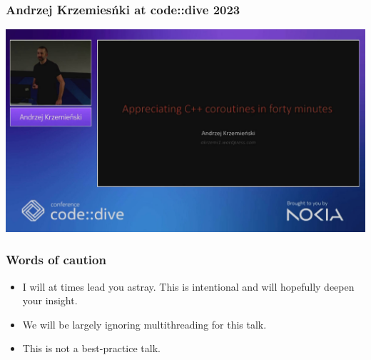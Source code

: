 \documentclass[aspectratio=169]{beamer}
\begin{document}
\begin{frame}
  \frametitle{Andrzej Krzemiesńki at code::dive 2023}

  \begin{center}
    \href{https://www.youtube.com/watch?v=ZSkign_3Hp4}{\includegraphics[height=.95\textheight]{corogfx2/talk_andrzej.jpg}}
  \end{center}
  
\end{frame}

\begin{frame}
  \frametitle{Words of caution}
  
  \begin{itemize}
  \item I will at times lead you astray. This is intentional and will hopefully deepen your insight.
  \vspace{20pt}
  \item We will be largely ignoring multithreading for this talk.
  \vspace{20pt}
  \item This is not a best-practice talk.
  \end{itemize}
\end{frame}
\end{document}
